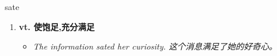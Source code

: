 
\begin{frame}
{\huge sate}
\begin{center}
\begin{enumerate}\Large
  \item \textbf{vt. 使饱足,充分满足}
  \begin{itemize}
    \item \em{\Large{The information sated her curiosity. 这个消息满足了她的好奇心。}}
  \end{itemize}
\end{enumerate}
\end{center}
\end{frame}
